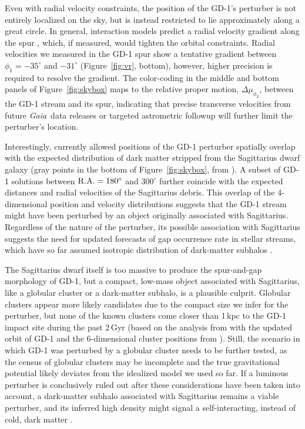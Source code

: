 \documentclass[twocolumn]{aastex63}
\newcommand{\gaia}{\textsl{Gaia}}
\begin{document}
Even with radial velocity constraints, the position of the GD-1's perturber is not entirely localized on the sky, but is instead restricted to lie approximately along a great circle.
In general, interaction models predict a radial velocity gradient along the spur \citep{bonaca2019a}, which, if measured, would tighten the orbital constraints.
Radial velocities we measured in the GD-1 spur show a tentative gradient between $\phi_1=-35^\circ$ and $-31^\circ$ (Figure~\ref{fig:vr}, bottom), however, higher precision is required to resolve the gradient.
The color-coding in the middle and bottom panels of Figure~\ref{fig:skybox} maps to the relative proper motion, $\Delta\mu_{\phi_2}$, between the GD-1 stream and its spur, indicating that precise transverse velocities from future \gaia\ data releases or targeted astrometric followup will further limit the perturber's location.

Interestingly, currently allowed positions of the GD-1 perturber spatially overlap with the expected distribution of dark matter stripped from the Sagittarius dwarf galaxy (gray points in the bottom of Figure~\ref{fig:skybox}, from \citealt{dl2017}).
A subset of GD-1 solutions between $\rm R.A.=180^\circ$ and $300^\circ$ further coincide with the expected distances and radial velocities of the Sagittarius debris.
This overlap of the 4-dimensional position and velocity distributions suggests that the GD-1 stream might have been perturbed by an object originally associated with Sagittarius.
Regardless of the nature of the perturber, its possible association with Sagittarius suggests the need for updated forecasts of gap occurrence rate in stellar streams, which have so far assumed isotropic distribution of dark-matter subhalos \citep[e.g.,][]{erkal2016, banik2019}.

The Sagittarius dwarf itself is too massive to produce the spur-and-gap morphology of GD-1, but a compact, low-mass object associated with Sagittarius, like a globular cluster or a dark-matter subhalo, is a plausible culprit.
Globular clusters appear more likely candidates due to the compact size we infer for the perturber, but none of the known clusters come closer than 1\,kpc to the GD-1 impact site during the past 2\,Gyr (based on the analysis from \citealt{bonaca2019a} with the updated orbit of GD-1 and the 6-dimensional cluster positions from \citealt{baumgardt2019}).
Still, the scenario in which GD-1 was perturbed by a globular cluster needs to be further tested, as the census of globular clusters may be incomplete and the true gravitational potential likely deviates from the idealized model we used so far.
If a luminous perturber is conclusively ruled out after these considerations have been taken into account, a dark-matter subhalo associated with Sagittarius remains a viable perturber, and its inferred high density might signal a self-interacting, instead of cold, dark matter \citep[e.g.,][]{kahlhoefer2019}.
\end{document}
